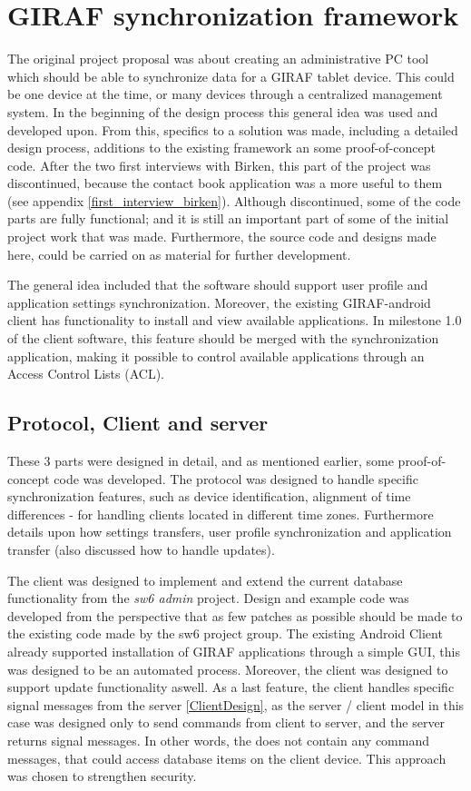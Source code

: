 \section{GIRAF synchronization framework}
The original project proposal was about creating an administrative PC tool which should be able to synchronize data for a GIRAF tablet device. This could be one device at the time, or many devices through a centralized management system. In the beginning of the design process this general idea was used and developed upon. From this, specifics to a solution was made, including a detailed design process, additions to the existing framework an some proof-of-concept code. After the two first interviews with Birken, this part of the project was discontinued, because the contact book application was a more useful to them (see appendix \vref{first_interview_birken}). Although discontinued, some of the code parts are fully functional; and it is still an important part of some of the initial project work that was made. Furthermore, the source code and designs made here, could be carried on as material for further development. 

The general idea included that the software should support user profile and application settings synchronization. Moreover, the existing GIRAF-android client has functionality to install and view available applications. In milestone 1.0 of the client software, this feature should be merged with the synchronization application, making it possible to control available applications through an Access Control Lists (ACL).

\subsection{Protocol, Client and server}
These 3 parts were designed in detail, and as mentioned earlier, some proof-of-concept code was developed. The protocol was designed to handle specific synchronization features, such as device identification, alignment of time differences - for handling clients located in different time zones. Furthermore details upon how settings transfers, user profile synchronization and application transfer (also discussed how to handle updates).  

The client was designed to implement and extend the current database functionality from the \emph{sw6 admin} project. Design and example code was developed from the perspective that as few patches as possible should be made to the existing code made by the sw6 project group.
The existing Android Client already supported installation of GIRAF applications through a simple GUI, this  was designed to be an automated process. Moreover, the client was designed to support update functionality aswell. As a last feature, the client handles specific signal messages from the server \vref{ClientDesign}, as the server / client model in this case was designed only to send commands from client to server, and the server returns signal messages. In other words, the does not contain any command messages, that could access database items on the client device. This approach was chosen to strengthen security.  

